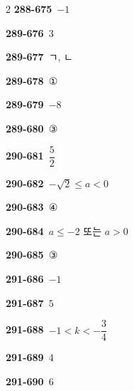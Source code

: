 \documentclass[10pt,a4paper]{article}
\begin{document}
\begin{multicols}{2}
\noindent\textbf{288-675}\ $-1$\par
\noindent\textbf{289-676}\ $3$\par
\noindent\textbf{289-677}\ ㄱ, ㄴ\par
\noindent\textbf{289-678}\ ①\par
\noindent\textbf{289-679}\ $-8$\par
\noindent\textbf{289-680}\ ③\par
\noindent\textbf{290-681}\ $\dfrac{5}{2}$\par
\noindent\textbf{290-682}\ $-\sqrt{2}\le a<0$\par
\noindent\textbf{290-683}\ ④\par
\noindent\textbf{290-684}\ $a\le -2$ 또는 $a>0$\par
\noindent\textbf{290-685}\ ③\par
\noindent\textbf{291-686}\ $-1$\par
\noindent\textbf{291-687}\ $5$\par
\noindent\textbf{291-688}\ $-1<k<-\dfrac{3}{4}$\par
\noindent\textbf{291-689}\ $4$\par
\noindent\textbf{291-690}\ $6$\par
\end{multicols}
\end{document}
